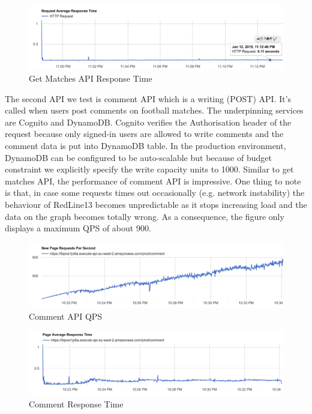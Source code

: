 \documentclass[conference]{IEEEtran}
\begin{document}
\begin{figure}[htbp]
\centerline{\includegraphics[scale=0.26]{matches-response-time.png}}
\caption{Get Matches API Response Time}
\end{figure}

The second API we test is comment API which is a writing (POST) API. It's called when users post comments on football matches. The underpinning services are Cognito and DynamoDB. Cognito verifies the Authorisation header of the request because only signed-in users are allowed to write comments and the comment data is put into DynamoDB table. In the production environment, DynamoDB can be configured to be auto-scalable but because of budget constraint we explicitly specify the write capacity units to 1000. Similar to get matches API, the performance of comment API is impressive. One thing to note is that, in case some requests times out occasionally (e.g. network instability) the behaviour of RedLine13 becomes unpredictable as it stops increasing load and the data on the graph becomes totally wrong. As a consequence, the figure only displays a maximum QPS of about 900.

\begin{figure}[htbp]
\centerline{\includegraphics[scale=0.26]{comment-qps.png}}
\caption{Comment API QPS}
\end{figure}

\begin{figure}[htbp]
\centerline{\includegraphics[scale=0.26]{comment-response-time.png}}
\caption{Comment Response Time}
\end{figure}
\end{document}
